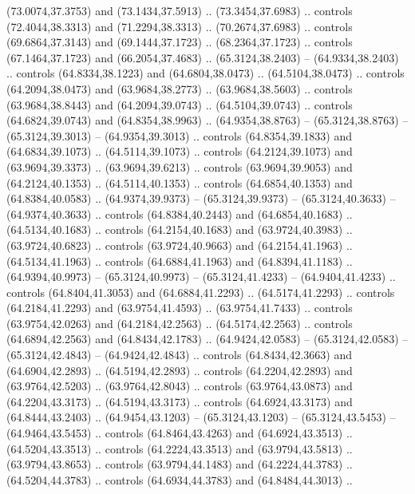 \begin{scope}[cm={{1.25,0.0,0.0,-1.25,(-71.74049,81.13304)}}]
        (73.0074,37.3753) and (73.1434,37.5913) .. (73.3454,37.6983) .. controls
        (72.4044,38.3313) and (71.2294,38.3313) .. (70.2674,37.6983) .. controls
        (69.6864,37.3143) and (69.1444,37.1723) .. (68.2364,37.1723) .. controls
        (67.1464,37.1723) and (66.2054,37.4683) .. (65.3124,38.2403) --
        (64.9334,38.2403) .. controls (64.8334,38.1223) and (64.6804,38.0473) ..
        (64.5104,38.0473) .. controls (64.2094,38.0473) and (63.9684,38.2773) ..
        (63.9684,38.5603) .. controls (63.9684,38.8443) and (64.2094,39.0743) ..
        (64.5104,39.0743) .. controls (64.6824,39.0743) and (64.8354,38.9963) ..
        (64.9354,38.8763) -- (65.3124,38.8763) -- (65.3124,39.3013) --
        (64.9354,39.3013) .. controls (64.8354,39.1833) and (64.6834,39.1073) ..
        (64.5114,39.1073) .. controls (64.2124,39.1073) and (63.9694,39.3373) ..
        (63.9694,39.6213) .. controls (63.9694,39.9053) and (64.2124,40.1353) ..
        (64.5114,40.1353) .. controls (64.6854,40.1353) and (64.8384,40.0583) ..
        (64.9374,39.9373) -- (65.3124,39.9373) -- (65.3124,40.3633) --
        (64.9374,40.3633) .. controls (64.8384,40.2443) and (64.6854,40.1683) ..
        (64.5134,40.1683) .. controls (64.2154,40.1683) and (63.9724,40.3983) ..
        (63.9724,40.6823) .. controls (63.9724,40.9663) and (64.2154,41.1963) ..
        (64.5134,41.1963) .. controls (64.6884,41.1963) and (64.8394,41.1183) ..
        (64.9394,40.9973) -- (65.3124,40.9973) -- (65.3124,41.4233) --
        (64.9404,41.4233) .. controls (64.8404,41.3053) and (64.6884,41.2293) ..
        (64.5174,41.2293) .. controls (64.2184,41.2293) and (63.9754,41.4593) ..
        (63.9754,41.7433) .. controls (63.9754,42.0263) and (64.2184,42.2563) ..
        (64.5174,42.2563) .. controls (64.6894,42.2563) and (64.8434,42.1783) ..
        (64.9424,42.0583) -- (65.3124,42.0583) -- (65.3124,42.4843) --
        (64.9424,42.4843) .. controls (64.8434,42.3663) and (64.6904,42.2893) ..
        (64.5194,42.2893) .. controls (64.2204,42.2893) and (63.9764,42.5203) ..
        (63.9764,42.8043) .. controls (63.9764,43.0873) and (64.2204,43.3173) ..
        (64.5194,43.3173) .. controls (64.6924,43.3173) and (64.8444,43.2403) ..
        (64.9454,43.1203) -- (65.3124,43.1203) -- (65.3124,43.5453) --
        (64.9464,43.5453) .. controls (64.8464,43.4263) and (64.6924,43.3513) ..
        (64.5204,43.3513) .. controls (64.2224,43.3513) and (63.9794,43.5813) ..
        (63.9794,43.8653) .. controls (63.9794,44.1483) and (64.2224,44.3783) ..
        (64.5204,44.3783) .. controls (64.6934,44.3783) and (64.8484,44.3013) ..

\end{scope}
